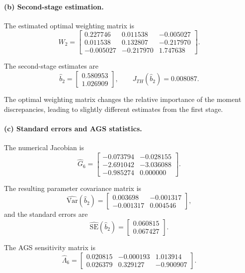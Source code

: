 \documentclass{article}
\begin{document}
\paragraph{(b) Second-stage estimation.}

The estimated optimal weighting matrix is
\[
    W_2
    =
    \begin{bmatrix}
        0.227746 & 0.011538 & -0.005027\\
        0.011538 & 0.132807 & -0.217970\\
        -0.005027 & -0.217970 & 1.747638
    \end{bmatrix}.
\]

The second-stage estimates are
\[
    \widehat b_2
    =
    \begin{bmatrix}
        0.580953\\
        1.026909
    \end{bmatrix},
    \qquad
    J_{TH}(\widehat b_2)=0.008087.
\]

The optimal weighting matrix changes the relative importance
of the moment discrepancies, leading to slightly different
estimates from the first stage.

\paragraph{(c) Standard errors and AGS statistics.}

The numerical Jacobian is
\[
    \widehat G_6
    =
    \begin{bmatrix}
        -0.073794 & -0.028155\\
        -2.691042 & -3.036088\\
        -0.985274 & 0.000000
    \end{bmatrix}.
\]

The resulting parameter covariance matrix is
\[
    \widehat{\mathrm{Var}}(\widehat b_2)
    =
    \begin{bmatrix}
        0.003698 & -0.001317\\
        -0.001317 & 0.004546
    \end{bmatrix},
\]
and the standard errors are
\[
    \widehat{\mathrm{SE}}(\widehat b_2)
    =
    \begin{bmatrix}
        0.060815\\
        0.067427
    \end{bmatrix}.
\]

The AGS sensitivity matrix is
\[
    \widehat\Lambda_6
    =
    \begin{bmatrix}
        0.020815 & -0.000193 & 1.013914\\
        0.026379 & 0.329127 & -0.900907
    \end{bmatrix}.
\]
\end{document}
